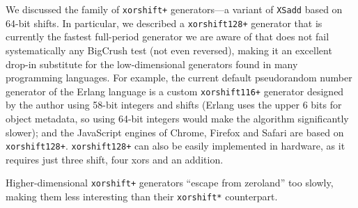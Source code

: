 \documentclass{acmsmalltr}
\newcommand{\xorshifts}[1][]{\texttt{xorshift#1*}\xspace}
\newcommand{\xorshiftp}[1][]{\texttt{xorshift#1+}\xspace}
\newcommand{\xsadd}{\texttt{XSadd}\xspace}
\begin{document}
We discussed the family of \xorshiftp generators---a variant of
\xsadd based on 64-bit shifts. In particular, we described a \xorshiftp[128]
generator that is currently the fastest full-period generator we are aware of
that does not fail systematically any BigCrush test (not even reversed), making
it an excellent drop-in substitute for the low-dimensional generators found in
many programming languages. For example, the current default pseudorandom
number generator of the Erlang language is a custom \xorshiftp[116] generator
designed by the author using 58-bit integers and shifts (Erlang uses the upper 6
bits for object metadata, so using 64-bit integers would make the algorithm
significantly slower); and the JavaScript engines of Chrome, Firefox and Safari
are based on \xorshiftp[128].
\xorshiftp[128] can also be easily implemented in 
hardware, as it requires just three shift, four xors and an addition.

Higher-dimensional \xorshiftp generators ``escape from zeroland'' too slowly, making them less interesting than their \xorshifts counterpart.


\end{document}

